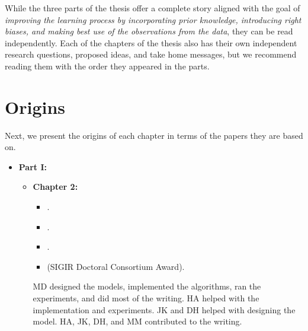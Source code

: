 \bigskip
While the three parts of the thesis offer a complete story aligned with the goal of \emph{improving the learning process by incorporating prior knowledge, introducing right biases, and making best use of the observations from the data}, they can be read independently. 
Each of the chapters of the thesis also has their own independent research questions, proposed ideas, and take home messages, but we recommend reading them with the order they appeared in the parts.


\section{Origins}
Next, we present the origins of each chapter in terms of the papers they are based on.
\begin{itemize}
    \setlength{\itemindent}{-28pt}
    \item[]\textbf{Part I:} \emph{}
%  
        \begin{itemize}
            \setlength{\itemindent}{-33pt}
            \item[]\textbf{Chapter 2:} \emph{}
            \begin{itemize}[label=\textbullet] 
                \item {}.
                \item {}.
                \item {}.
                \item {} (SIGIR Doctoral Consortium Award).
            \end{itemize}
            
            {\footnotesize{MD designed the models, implemented the algorithms, ran the experiments, and did most of the writing. HA helped with the implementation and experiments. JK and DH helped with designing the model. HA, JK, DH, and MM contributed to the writing.}\medskip}
            

\end{itemize}
\end{itemize}
